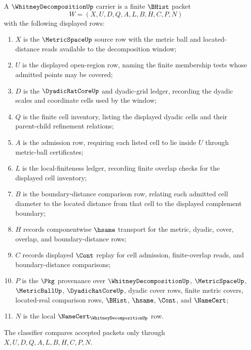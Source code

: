 \begin{definition}
\label{def:whitney-decomposition-carrier}
A $\WhitneyDecompositionUp$ carrier is a finite $\BHist$ packet
$$
W=(X,U,D,Q,A,L,B,H,C,P,N)
$$
with the following displayed rows:
\begin{enumerate}
\item $X$ is the $\MetricSpaceUp$ source row with the metric ball and located-distance reads available to the decomposition window;
\item $U$ is the displayed open-region row, naming the finite membership tests whose admitted points may be covered;
\item $D$ is the $\DyadicRatCoreUp$ and dyadic-grid ledger, recording the dyadic scales and coordinate cells used by the window;
\item $Q$ is the finite cell inventory, listing the displayed dyadic cells and their parent-child refinement relations;
\item $A$ is the admission row, requiring each listed cell to lie inside $U$ through metric-ball certificates;
\item $L$ is the local-finiteness ledger, recording finite overlap checks for the displayed cell inventory;
\item $B$ is the boundary-distance comparison row, relating each admitted cell diameter to the located distance from that cell to the displayed complement boundary;
\item $H$ records componentwise $\hsame$ transport for the metric, dyadic, cover, overlap, and boundary-distance rows;
\item $C$ records displayed $\Cont$ replay for cell admission, finite-overlap reads, and boundary-distance comparisons;
\item $P$ is the $\Pkg$ provenance over $\WhitneyDecompositionUp$, $\MetricSpaceUp$, $\MetricBallUp$, $\DyadicRatCoreUp$, dyadic cover rows, finite metric covers, located-real comparison rows, $\BHist$, $\hsame$, $\Cont$, and $\NameCert$;
\item $N$ is the local $\NameCert_{\WhitneyDecompositionUp}$ row.
\end{enumerate}
The classifier compares accepted packets only through $X,U,D,Q,A,L,B,H,C,P,N$.
\end{definition}


